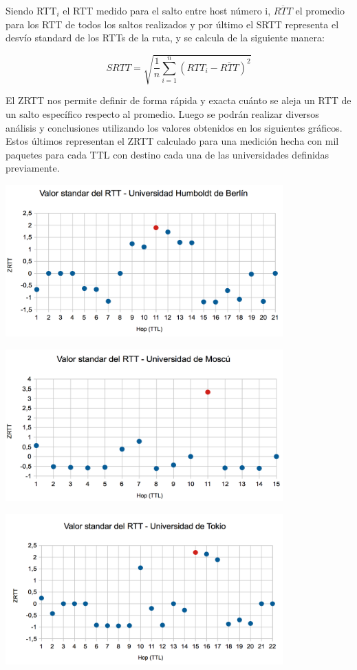  Siendo RTT$_{i}$ el RTT medido para el salto entre host número i, $\overline{RTT}$ el promedio para los RTT de todos los saltos realizados y por último el SRTT representa el desvío standard de los RTTs de la ruta, y se calcula de la siguiente manera:

\begin{equation}
 	SRTT = \sqrt{\frac{1}{n} \sum_{i=1}^{n} (RTT_i - \overline{RTT})^2}
 \end{equation}

El ZRTT nos permite definir de forma rápida y exacta cuánto se aleja un RTT de un salto específico respecto al promedio. Luego se podrán realizar diversos análisis y conclusiones utilizando los valores obtenidos en los siguientes gráficos. Estos últimos representan el ZRTT calculado para una medición hecha con mil paquetes para cada TTL con destino cada una de las universidades definidas previamente. 

\centerline{\includegraphics[width=0.8\textwidth]{imagenes/1ra_parte/Alemania_3ergrafico.png}}

\centerline{\includegraphics[width=0.8\textwidth]{imagenes/1ra_parte/Rusia_3ergrafico.png}}

\centerline{\includegraphics[width=0.8\textwidth]{imagenes/1ra_parte/Japon_3ergrafico.png}}

